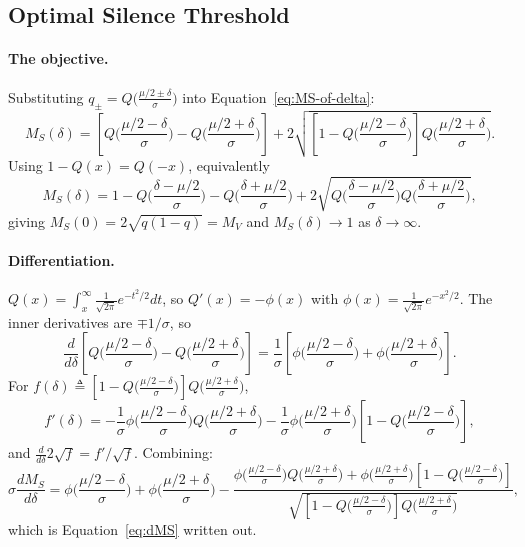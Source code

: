 \documentclass[11pt]{article}
\begin{document}
\subsection{Optimal Silence Threshold}
\label{app:delta}
\paragraph{The objective.} Substituting $q_\pm = Q\big(\frac{\mu/2\pm\delta}{\sigma}\big)$ into Equation~\eqref{eq:MS-of-delta}:
\begin{equation}
    M_S(\delta) = \left[Q\Big(\frac{\mu/2-\delta}{\sigma}\Big) - Q\Big(\frac{\mu/2+\delta}{\sigma}\Big)\right] + 2\sqrt{\left[1-Q\Big(\frac{\mu/2-\delta}{\sigma}\Big)\right]Q\Big(\frac{\mu/2+\delta}{\sigma}\Big)}.
    \label{eq:MS-explicit}
\end{equation}
Using $1-Q(x) = Q(-x)$, equivalently
\begin{equation}
    M_S(\delta) = 1 - Q\Big(\frac{\delta-\mu/2}{\sigma}\Big) - Q\Big(\frac{\delta+\mu/2}{\sigma}\Big) + 2\sqrt{Q\Big(\frac{\delta-\mu/2}{\sigma}\Big)Q\Big(\frac{\delta+\mu/2}{\sigma}\Big)},
    \label{eq:MS-tails}
\end{equation}
giving $M_S(0) = 2\sqrt{q(1-q)} = M_V$ and $M_S(\delta)\to 1$ as $\delta\to\infty$.

\paragraph{Differentiation.} $Q(x) = \int_x^\infty \frac{1}{\sqrt{2\pi}}e^{-t^2/2}dt$, so $Q'(x) = -\phi(x)$ with $\phi(x) = \frac{1}{\sqrt{2\pi}}e^{-x^2/2}$. The inner derivatives are $\mp 1/\sigma$, so
\begin{equation}
    \frac{d}{d\delta}\left[Q\Big(\frac{\mu/2-\delta}{\sigma}\Big) - Q\Big(\frac{\mu/2+\delta}{\sigma}\Big)\right] = \frac{1}{\sigma}\left[\phi\Big(\frac{\mu/2-\delta}{\sigma}\Big) + \phi\Big(\frac{\mu/2+\delta}{\sigma}\Big)\right].
\end{equation}
For $f(\delta) \triangleq \left[1-Q\Big(\frac{\mu/2-\delta}{\sigma}\Big)\right]Q\Big(\frac{\mu/2+\delta}{\sigma}\Big)$,
\begin{equation}
    f'(\delta) = -\frac{1}{\sigma}\phi\Big(\frac{\mu/2-\delta}{\sigma}\Big)Q\Big(\frac{\mu/2+\delta}{\sigma}\Big) - \frac{1}{\sigma}\phi\Big(\frac{\mu/2+\delta}{\sigma}\Big)\left[1-Q\Big(\frac{\mu/2-\delta}{\sigma}\Big)\right],
\end{equation}
and $\frac{d}{d\delta}2\sqrt{f} = f'/\sqrt{f}$. Combining:
\begin{equation}
    \sigma\frac{dM_S}{d\delta} = \phi\Big(\frac{\mu/2-\delta}{\sigma}\Big) + \phi\Big(\frac{\mu/2+\delta}{\sigma}\Big) - \frac{\phi\Big(\frac{\mu/2-\delta}{\sigma}\Big)Q\Big(\frac{\mu/2+\delta}{\sigma}\Big) + \phi\Big(\frac{\mu/2+\delta}{\sigma}\Big)\left[1-Q\Big(\frac{\mu/2-\delta}{\sigma}\Big)\right]}{\sqrt{\left[1-Q\Big(\frac{\mu/2-\delta}{\sigma}\Big)\right]Q\Big(\frac{\mu/2+\delta}{\sigma}\Big)}},
    \label{eq:app-full-derivative}
\end{equation}
which is Equation~\eqref{eq:dMS} written out.
\end{document}
